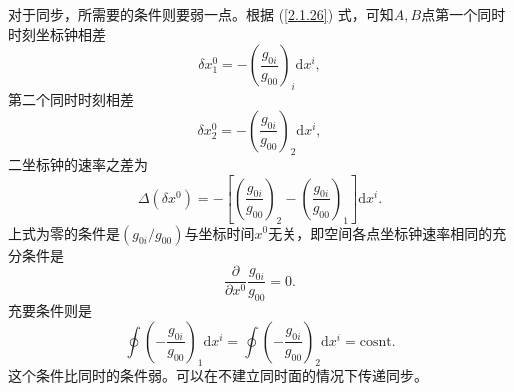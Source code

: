 \documentclass[11pt, a4paper, oneside, onecolumn]{ctexart}
\numberwithin{equation}{subsection}
\begin{document}
对于同步，所需要的条件则要弱一点。根据 (\ref{2.1.26}) 式，可知$A,B$点第一个同时时刻坐标钟相差
\begin{equation}
\delta{}x_{1}^{0}=-\left(\frac{g_{0i}}{g_{00}}\right)_{i}\mathrm{d}x^{i},
\end{equation}
第二个同时时刻相差
\begin{equation}
\delta{}x_{2}^{0}=-\left(\frac{g_{0i}}{g_{00}}\right)_{2}\mathrm{d}x^{i},
\end{equation}
二坐标钟的速率之差为
\begin{equation}
\Delta{}\left(\delta{}x^{0}\right)=-\left[\left(\frac{g_{0i}}{g_{00}}\right)_{2}-\left(\frac{g_{0i}}{g_{00}}\right)_{1}\right]\mathrm{d}x^{i}.
\end{equation}
上式为零的条件是$\left(g_{0i}/g_{00}\right)$与坐标时间$x^{0}$无关，即空间各点坐标钟速率相同的充分条件是
\begin{equation}
\frac{\partial{}}{\partial{}x^{0}}\frac{g_{0i}}{g_{00}}=0.
\end{equation}
充要条件则是
\begin{equation}
\oint\left(-\frac{g_{0i}}{g_{00}}\right)_{1}\mathrm{d}x^{i}=\oint\left(-\frac{g_{0i}}{g_{00}}\right)_{2}\mathrm{d}x^{i}=\text{cosnt}.
\end{equation}
这个条件比同时的条件弱。可以在不建立同时面的情况下传递同步。
\end{document}

